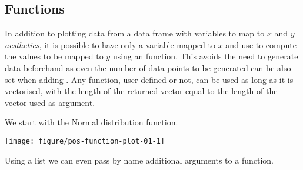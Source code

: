 \documentclass[krantz2]{krantz}\usepackage{knitr}%
\begin{document}
\subsection{Functions}\label{sec:plot:function}
In addition to plotting data from a data frame with variables to map to $x$ and $y$ \emph{aesthetics}, it is possible to have only a variable mapped to $x$ and use  to compute the values to be mapped to $y$ using an \Rlang function. This avoids the need to generate data beforehand as even the number of data points to be generated can be also set when adding . Any \Rlang function, user defined or not, can be used as long as it is vectorised, with the length of the returned vector equal to the length of the vector used as  argument.

We start with the Normal distribution function.

\begin{knitrout}\footnotesize
{}\color{fgcolor}\begin{kframe}
\begin{alltt}
\hlstd{(}\hlstd{(} \hlstd{=} \hlopt{-}\hlopt{:}\hlstd{),} \hlstd{(}  \hlopt{+}
  \hlstd{(} 
\end{alltt}
\end{kframe}

{\centering \texttt{[image: figure/pos-function-plot-01-1]} 

}



\end{knitrout}

Using a list we can even pass by name additional arguments to a function.

\begin{knitrout}\footnotesize
{}\color{fgcolor}\begin{kframe}
\begin{alltt}
\hlstd{(}\hlstd{(} \hlstd{=} \hlopt{-}\hlopt{:}\hlstd{),} \hlstd{(}  \hlopt{+}
  \hlstd{(}   \hlstd{=} \hlstd{(} \hlstd{=} \hlstd{,}  \hlstd{=} \hlstd{))}
\end{alltt}
\end{kframe}
\end{knitrout}
\end{document}
